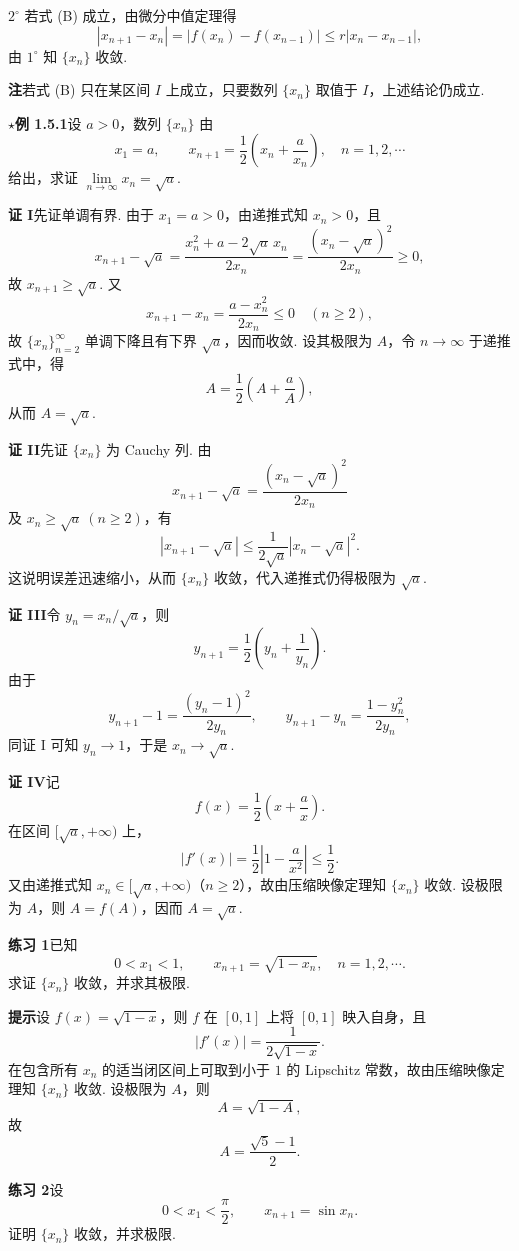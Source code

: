 \documentclass[UTF8, 12pt, fontset=fandol, oneside]{ctexart}
\begin{document}
$2^\circ$ 若式 (B) 成立，由微分中值定理得
\[
  |x_{n+1}-x_n|=|f(x_n)-f(x_{n-1})|
  \le r|x_n-x_{n-1}|,
\]
由 $1^\circ$ 知 $\{x_n\}$ 收敛.

\noindent\textbf{注}\quad 若式 (B) 只在某区间 $I$ 上成立，只要数列 $\{x_n\}$ 取值于 $I$，上述结论仍成立.

\noindent\textbf{$\star$例 1.5.1}\quad 设 $a>0$，数列 $\{x_n\}$ 由
\[
  x_1=a,\qquad x_{n+1}=\frac{1}{2}\left(x_n+\frac{a}{x_n}\right),\quad n=1,2,\cdots
\]
给出，求证 $\lim\limits_{n\to\infty}x_n=\sqrt a$.

\noindent\textbf{证 I}\quad 先证单调有界. 由于 $x_1=a>0$，由递推式知 $x_n>0$，且
\[
  x_{n+1}-\sqrt a
  =\frac{x_n^2+a-2\sqrt a\,x_n}{2x_n}
  =\frac{(x_n-\sqrt a)^2}{2x_n}\ge 0,
\]
故 $x_{n+1}\ge \sqrt a$. 又
\[
  x_{n+1}-x_n
  =\frac{a-x_n^2}{2x_n}
  \le 0\quad (n\ge 2),
\]
故 $\{x_n\}_{n=2}^\infty$ 单调下降且有下界 $\sqrt a$，因而收敛. 设其极限为 $A$，令 $n\to\infty$ 于递推式中，得
\[
  A=\frac{1}{2}\left(A+\frac{a}{A}\right),
\]
从而 $A=\sqrt a$.

\noindent\textbf{证 II}\quad 先证 $\{x_n\}$ 为 Cauchy 列. 由
\[
  x_{n+1}-\sqrt a=\frac{(x_n-\sqrt a)^2}{2x_n}
\]
及 $x_n\ge \sqrt a\ (n\ge 2)$，有
\[
  |x_{n+1}-\sqrt a|\le \frac{1}{2\sqrt a}|x_n-\sqrt a|^2.
\]
这说明误差迅速缩小，从而 $\{x_n\}$ 收敛，代入递推式仍得极限为 $\sqrt a$.

\noindent\textbf{证 III}\quad 令 $y_n=x_n/\sqrt a$，则
\[
  y_{n+1}=\frac{1}{2}\left(y_n+\frac{1}{y_n}\right).
\]
由于
\[
  y_{n+1}-1=\frac{(y_n-1)^2}{2y_n},\qquad
  y_{n+1}-y_n=\frac{1-y_n^2}{2y_n},
\]
同证 I 可知 $y_n\to 1$，于是 $x_n\to \sqrt a$.

\noindent\textbf{证 IV}\quad 记
\[
  f(x)=\frac{1}{2}\left(x+\frac{a}{x}\right).
\]
在区间 $[\sqrt a,+\infty)$ 上，
\[
  |f'(x)|=\frac{1}{2}\left|1-\frac{a}{x^2}\right|\le \frac12.
\]
又由递推式知 $x_n\in[\sqrt a,+\infty)$（$n\ge2$），故由压缩映像定理知 $\{x_n\}$ 收敛. 设极限为 $A$，则 $A=f(A)$，因而 $A=\sqrt a$.

\noindent\textbf{练习 1}\quad 已知
\[
  0<x_1<1,\qquad x_{n+1}=\sqrt{1-x_n},\quad n=1,2,\cdots.
\]
求证 $\{x_n\}$ 收敛，并求其极限.

\noindent\textbf{提示}\quad 设 $f(x)=\sqrt{1-x}$，则 $f$ 在 $[0,1]$ 上将 $[0,1]$ 映入自身，且
\[
  |f'(x)|=\frac{1}{2\sqrt{1-x}}.
\]
在包含所有 $x_n$ 的适当闭区间上可取到小于 $1$ 的 Lipschitz 常数，故由压缩映像定理知 $\{x_n\}$ 收敛. 设极限为 $A$，则
\[
  A=\sqrt{1-A},
\]
故
\[
  A=\frac{\sqrt5-1}{2}.
\]

\noindent\textbf{练习 2}\quad 设
\[
  0<x_1<\frac{\pi}{2},\qquad x_{n+1}=\sin x_n.
\]
证明 $\{x_n\}$ 收敛，并求极限.
\end{document}
